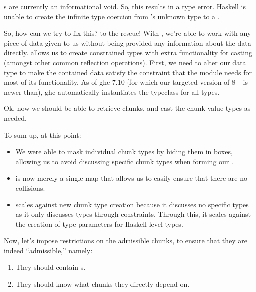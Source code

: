\Chunk{}s are currently an informational void. So, this results in a type
error. Haskell is unable to create the infinite
type coercion from 's unknown type to a \QuantityDict{}.

So, how can we try to fix this?  to the rescue! With
, we're able to work with any piece of data given to us
without being provided any information about the data directly.
 allows us to create constrained types with extra
functionality for casting (amongst other common reflection operations). First,
we need to alter our \Chunk{} data type to make the contained data satisfy the
\Typeable{} constraint that the \Typeable{} module needs for most of its
functionality. As of \acs{ghc} 7.10 (for which our targeted version of 8+ is
newer than), \acs{ghc} automatically instantiates the \Typeable{} typeclass for
all types.

\examinableChunkBox{}

Ok, now we should be able to retrieve chunks, and cast the chunk value types as
needed.

\workingChunkRetriever{}

To sum up, at this point:

\begin{itemize}

      \item We were able to mask individual chunk types by hiding them in
            \Chunk{} boxes, allowing us to avoid discussing specific chunk types
            when forming our \ChunkDB{}.

      \item \ChunkDB{} is now merely a single map that allows us to easily
            ensure that there are no \UID{} collisions.

      \item \ChunkDB{} scales against new chunk type creation because it
            discusses no specific types as it only discusses types through
            constraints. Through this, it scales against the creation of type
            parameters for Haskell-level types.

\end{itemize}

Now, let's impose restrictions on the admissible chunks, to ensure that they are
indeed ``admissible,'' namely:

\begin{enumerate}
      
      \item They should contain \UID{}s.
      
      \item They should know what chunks they directly depend on.

\end{enumerate}

